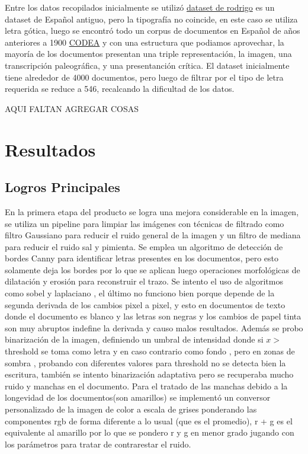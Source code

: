 \documentclass[11pt,a4paper]{article}
\begin{document}
Entre los datos recopilados inicialmente se utiliz\'o \href{https://zenodo.org/records/1490009/files/Rodrigo%20corpus%201.0.0.tar.gz?download=1}{dataset de rodrigo} es un dataset de Español antiguo, pero la tipograf\'ia no coincide, en este caso se utiliza letra g\'otica, luego se encontr\'o todo un corpus de documentos en Español de años anteriores a 1900 \href{https://corpuscodea.es/}{CODEA} y con una estructura que podiamos aprovechar, la mayor\'ia de los documentos presentan una triple representaci\'on, la imagen, una transcripción paleogr\'afica, y una presentanci\'on cr\'itica. El dataset inicialmente tiene alrededor de 4000 documentos, pero luego de filtrar por el tipo de letra requerida se reduce a 546, recalcando la dificultad de los datos.

AQUI FALTAN AGREGAR COSAS

\section{Resultados} 
\subsection{Logros Principales} 

En la primera etapa del producto se logra una mejora considerable en la imagen, se utiliza un pipeline para limpiar las im\'agenes con t\'ecnicas de filtrado como filtro Gaussiano para reducir el ruido general de la imagen y un filtro de mediana para reducir el ruido sal y pimienta. Se emplea un algoritmo de detecci\'on de bordes Canny para identificar letras presentes en los documentos, pero esto solamente deja los bordes por lo que se aplican luego operaciones morfol\'ogicas de dilataci\'on y erosi\'on para reconstruir el trazo. Se intento el uso de algoritmos como sobel y laplaciano , el \'ultimo no funciono bien porque depende de la segunda derivada de los cambios pixel a pixel, y esto en documentos de texto donde el documento es blanco y las letras son negras y los cambios de papel tinta son muy abruptos indefine la derivada y causo malos resultados. Adem\'as se probo binarizaci\'on de la imagen, definiendo un umbral de intensidad donde si $x >$ threshold se toma como letra y en caso contrario como fondo , pero en zonas de sombra , probando con diferentes valores para threshold no se detecta bien la escritura, tambi\'en se intento binarizaci\'on adaptativa pero se recuperaba mucho ruido y manchas en el documento. Para el tratado de las manchas debido a la longevidad de los documentos(son amarillos) se implement\'o un conversor personalizado de la imagen de color a escala de grises ponderando las componentes rgb de forma diferente a lo usual (que es el promedio), r + g es el equivalente al amarillo por lo que se pondero r y g en menor grado jugando con los par\'ametros para tratar de contrarestar el ruido.
\end{document}
